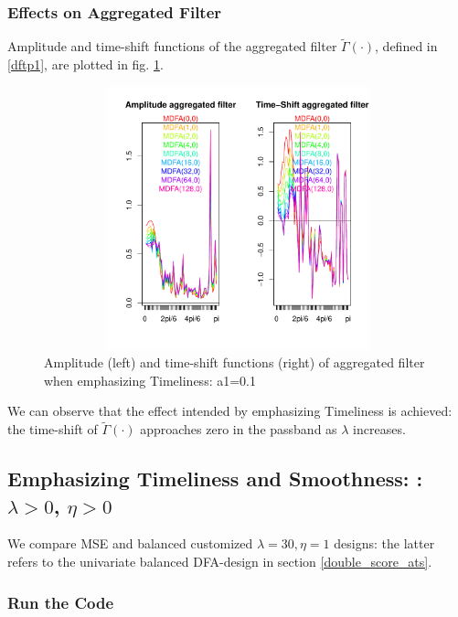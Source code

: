 \documentclass[a4paper]{book}
\begin{document}
\subsubsection{Effects on Aggregated Filter}


Amplitude and time-shift functions of the aggregated filter $\tilde{\Gamma}(\cdot)$, defined in \ref{dftp1}, are plotted in fig. \ref{z_amp_shift_mdfacust_leadind_agg_T}.
\begin{figure}[H]\begin{center}\includegraphics[height=3in, width=6in]{z_amp_shift_mdfacust_leadind_agg_T}\caption{Amplitude (left) and time-shift functions (right) of aggregated filter when emphasizing Timeliness: a1=0.1\label{z_amp_shift_mdfacust_leadind_agg_T}}\end{center}\end{figure}We can observe that the effect intended by emphasizing Timeliness is achieved: the time-shift of $\tilde{\Gamma}(\cdot)$ approaches zero in the passband as $\lambda$ increases.







\subsection{Emphasizing Timeliness and Smoothness: : $\lambda> 0$, $\eta>0$}

We compare MSE and balanced customized $\lambda=30,\eta=1$ designs: the latter refers to the univariate balanced DFA-design in section \ref{double_score_ats}.

\subsubsection{Run the Code}
\end{document}
